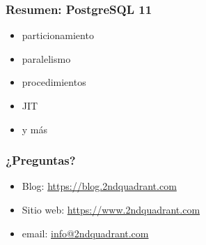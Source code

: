 \begin{frame}
  \frametitle{Resumen: PostgreSQL 11}
  \begin{itemize}
    \item particionamiento
    \item paralelismo
    \item procedimientos
    \item JIT
    \item y más
  \end{itemize}
\end{frame}

\begin{frame}
  \frametitle{¿Preguntas?}

  \begin{itemize}
    \item Blog: \url{https://blog.2ndquadrant.com}
    \item Sitio web: \url{https://www.2ndquadrant.com}
    \item email: \url{info@2ndquadrant.com}
  \end{itemize}
\end{frame}
